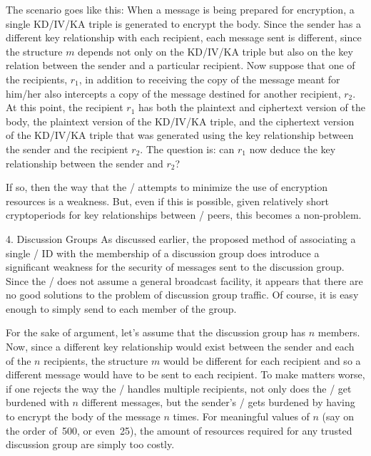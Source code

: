 \item{} The scenario goes like this:
When a message is being prepared for encryption,
a single KD/IV/KA triple is generated to encrypt the body.
Since the sender has a different key relationship with each recipient,
each message sent is different, since the structure $m$ depends not only on
the KD/IV/KA triple but also on the key relation between the sender and a
particular recipient.
Now suppose that one of the recipients, $r_1$,
in addition to receiving the copy of the message meant for him/her also
intercepts a copy of the message destined for another recipient, $r_2$.
At this point,
the recipient $r_1$ has both the plaintext and ciphertext version of the body,
the plaintext version of the KD/IV/KA triple,
and the ciphertext version of the KD/IV/KA triple that was generated using
the key relationship between the sender and the recipient $r_2$.
The question is:
can $r_1$ now deduce the key relationship between the sender and $r_2$?

\item{} If so, then the way that the \TMA/ attempts to minimize the use of
encryption resources is a weakness.
But, even if this is possible,
given relatively short cryptoperiods for key relationships between \TMA/
peers,
this becomes a non-problem.

\item{4.} Discussion Groups\hbreak
As discussed earlier,
the proposed method of associating a single \KDS/ ID with the membership of a
discussion group does introduce a significant weakness for the security of
messages sent to the discussion group.
Since the \TMA/ does not assume a general broadcast facility,
it appears that there are no good solutions to the problem of discussion
group traffic.
Of course,
it is easy enough to simply send to each member of the group.

\item{} For the sake of argument,
let's assume that the discussion group has $n$ members.
Now,
since a different key relationship would exist between the sender and
each of the $n$ recipients,
the structure $m$ would be different for each recipient
and so a different message would have to be sent to each recipient.
To make matters worse,
if one rejects the way the \TMA/ handles multiple recipients,
not only does the \MTS/ get burdened with $n$ different messages,
but the sender's \TMA/ gets burdened by having to encrypt
the body of the message $n$ times.
For meaningful values of $n$ (say on the order of~500, or even~25),
the amount of resources required for any trusted discussion group are simply
too costly.

